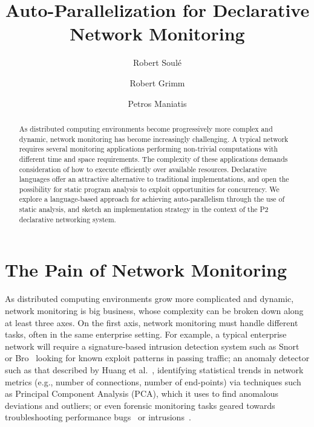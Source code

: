 \documentclass[10pt,twocolumn]{MyTightStyle}
\begin{document}
\title{Auto-Parallelization for Declarative Network Monitoring}

\author[1]{Robert Soul\'{e}}
\author[1]{Robert Grimm}
\author[2]{Petros Maniatis}


\date{} 
\maketitle 

\begin{abstract}

As distributed computing environments become progressively more complex and dynamic, network monitoring has become increasingly challenging. A typical network requires several monitoring applications performing non-trivial computations with different time and space requirements. The complexity of these applications demands consideration of how to execute efficiently over available resources. Declarative languages offer an attractive alternative to traditional implementations, and open the possibility for static program analysis to exploit opportunities for concurrency. We explore a language-based approach for achieving auto-parallelism through the use of static analysis, and sketch an implementation strategy in the context of the P2 declarative networking system.


\end{abstract}


\section{The Pain of Network Monitoring} \label{pain}


As distributed computing environments grow more complicated and
dynamic, network monitoring is big business, whose complexity
can be broken down along at least three axes.  On the first axis,
network monitoring must handle different tasks, often in the same
enterprise setting. For example, a typical enterprise network will
require a signature-based intrusion detection system such as
Snort~\cite{attig05} or Bro~\cite{paxson99} looking for known exploit
patterns in passing traffic; an anomaly detector such as that described
by Huang et al.~\cite{huang07}, identifying statistical trends in network
metrics (e.g., number of connections, number of end-points) via
techniques such as Principal Component Analysis (PCA), which it uses to find
anomalous deviations and outliers; or even forensic monitoring tasks
geared towards troubleshooting performance bugs~\cite{ArpaciDusseau03} or
intrusions~\cite{King2005}.
\end{document}
